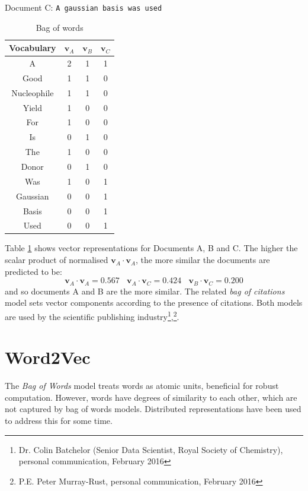 Document C: \texttt{A gaussian basis was used}
\begin{table}[H]
\caption{Bag of words}
\label{tab:BAGOFWORDS}
\begin{center}
\begin{tabular}{||c|c|c|c||}
\hline
Vocabulary &  $\mathbf{v}_A$ & $\mathbf{v}_B$ & $\mathbf{v}_C$\\
\hline
A & 2 & 1 & 1\\
Good & 1 & 1 & 0\\
Nucleophile & 1 & 1 & 0 \\
Yield & 1 & 0 & 0\\
For & 1& 0 & 0\\
Is & 0 & 1 & 0\\
The & 1 & 0 & 0\\
Donor & 0 & 1 & 0\\
Was & 1 & 0 & 1\\
Gaussian & 0 & 0 & 1\\
Basis & 0 & 0 & 1\\
Used & 0 & 0 & 1\\
\hline
\end{tabular}
\end{center}
\end{table}
Table \ref{tab:BAGOFWORDS} shows vector representations for Documents A, B and C. The higher the scalar product of normalised $\mathbf{v}_A \cdot \mathbf{v}_A$, the more similar the documents are predicted to be:
 $$\mathbf{v}_A \cdot \mathbf{v}_A = 0.567 \ \ \ \ \mathbf{v}_A \cdot \mathbf{v}_C = 0.424 \ \ \ \ \mathbf{v}_B \cdot \mathbf{v}_C=0.200$$ 
and so documents A and B are the more similar.
The related \emph{bag of citations} model sets vector components according to the presence of citations. Both models are used by the scientific publishing industry\footnote{Dr. Colin Batchelor  (Senior Data Scientist, Royal Society of Chemistry), personal communication, February 2016},\footnote{P.E. Peter Murray-Rust, personal communication, February 2016}.
\section{Word2Vec}
\label{sec:WORD2VEC}
The \emph{Bag of Words} model treats words as atomic units, beneficial for robust computation. However, words have degrees of similarity to each other, which are not captured by bag of words models\cite{word2veckingqueen}. Distributed representations have been used to address this for some time\cite{distributedrepresentations}.

